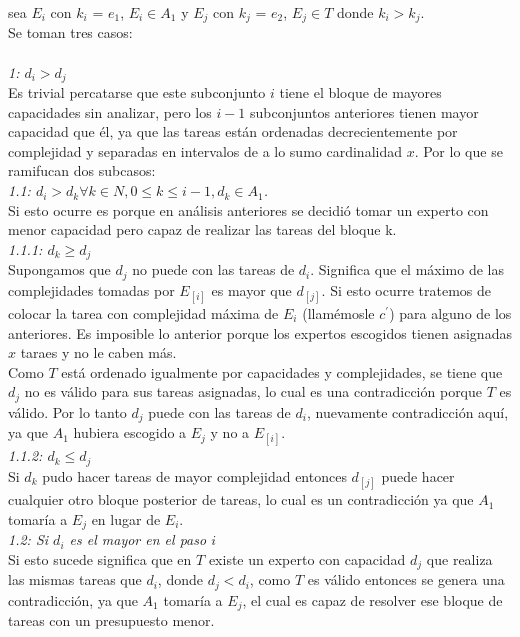 \documentclass[10pt,letterpaper]{article}
\begin{document}
{ 	sea $E_{i}$ con $k_{i}$ = $e_{1}$, $E_{i} \in A_{1}$ y $E_{j}$ con $k_{j}$ = $e_{2}$, $E_{j} \in T$ donde $k_{i} > k_{j}$. \\
 	Se toman tres casos: \\ \\
 	\textit{1: $d_{i} > d_{j}$} \\
 	Es trivial percatarse que este subconjunto $i$ tiene el bloque de mayores capacidades sin analizar, pero los $i- 1$ subconjuntos anteriores tienen mayor capacidad que \'el, ya que las tareas est\'an ordenadas decrecientemente por complejidad y separadas en intervalos de a lo sumo cardinalidad $x$. Por lo que se ramifucan dos subcasos: \\
 	\textit{1.1: $d_{i} > d_{k} \forall k \in N, 0 \leq k \leq i - 1, d_{k} \in A_{1}$.} \\
 	Si esto ocurre es porque en an\'alisis anteriores se decidi\'o tomar un experto con menor capacidad pero capaz de realizar las tareas del bloque k. \\
 	\textit{1.1.1: $d_{k} \geq d_{j}$} \\
 	Supongamos que $d_{j}$ no puede con las tareas de $d_{i}$. Significa que el m\'aximo de las complejidades tomadas por $E_[i]$ es mayor que $d_[j]$. Si esto ocurre tratemos de colocar la tarea con complejidad m\'axima de $E_{i}$ (llam\'emosle $c^{'}$) para alguno de los anteriores. Es imposible lo anterior porque los expertos escogidos tienen asignadas $x$ taraes y no le caben m\'as. \\
 	Como $T$ est\'a ordenado igualmente por capacidades y complejidades, se tiene que $d_{j}$ no es v\'alido para sus tareas asignadas, lo cual es una contradicci\'on porque $T$ es v\'alido. Por lo tanto $d_{j}$ puede con las tareas de $d_{i}$, nuevamente contradicci\'on aqu\'i, ya que $A_{1}$ hubiera escogido a $E_{j}$ y no a $E_[i]$. \\
 	\textit{1.1.2: $d_{k} \leq d_{j}$ } \\
 	Si $d_{k}$ pudo hacer tareas de mayor complejidad entonces $d_[j]$ puede hacer cualquier otro bloque posterior de tareas, lo cual es un contradicci\'on ya que $A_{1}$ tomar\'ia a $E_{j}$ en lugar de $E_{i}$. \\
 	\textit{1.2: Si $d_{i}$ es el mayor en el paso $i$ } \\
 	Si esto sucede significa que en $T$ existe un experto con capacidad $d_{j}$ que realiza las mismas tareas que $d_{i}$, donde $d_{j} < d_{i}$, como $T$ es v\'alido entonces se genera una contradicci\'on, ya que $A_{1}$ tomar\'ia a $E_{j}$, el cual es capaz de resolver ese bloque de tareas con un presupuesto menor. \\ \\   
}
\end{document}

